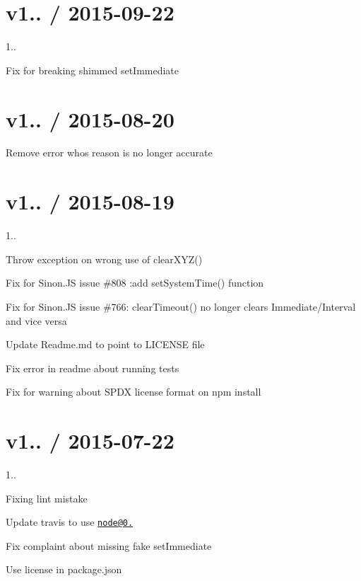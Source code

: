 \section*{v1.. / 2015-\/09-\/22 }


\begin{DoxyItemize}
\item 1..
\item Fix for breaking shimmed set\+Immediate
\end{DoxyItemize}

\section*{v1.. / 2015-\/08-\/20 }


\begin{DoxyItemize}
\item Remove error whos reason is no longer accurate
\end{DoxyItemize}

\section*{v1.. / 2015-\/08-\/19 }


\begin{DoxyItemize}
\item 1..
\item Throw exception on wrong use of clear\+X\+Y\+Z()
\item Fix for Sinon.\+JS issue \#808 \+:add set\+System\+Time() function
\item Fix for Sinon.\+JS issue \#766\+: clear\+Timeout() no longer clears Immediate/\+Interval and vice versa
\item Update Readme.\+md to point to L\+I\+C\+E\+N\+SE file
\item Fix error in readme about running tests
\item Fix for warning about S\+P\+DX license format on npm install
\end{DoxyItemize}

\section*{v1.. / 2015-\/07-\/22 }


\begin{DoxyItemize}
\item 1..
\item Fixing lint mistake
\item Update travis to use \href{mailto:node@0.12}{\tt node@0.}
\item Fix complaint about missing fake set\+Immediate
\item Use license in package.\+json
\end{DoxyItemize}

